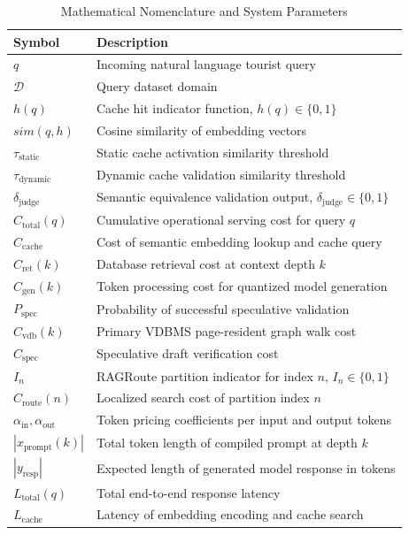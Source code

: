 \documentclass{ieeeaccess}
\begin{document}
\begin{table}[!t]
\centering
\caption{Mathematical Nomenclature and System Parameters}
\begin{tabular}{ll}
\toprule
\textbf{Symbol} & \textbf{Description} \\
\midrule
$q$ & Incoming natural language tourist query \\
$\mathcal{D}$ & Query dataset domain \\
$h(q)$ & Cache hit indicator function, $h(q) \in \{0, 1\}$ \\
$sim(q, h)$ & Cosine similarity of embedding vectors \\
$\tau_{\text{static}}$ & Static cache activation similarity threshold \\
$\tau_{\text{dynamic}}$ & Dynamic cache validation similarity threshold \\
$\delta_{\text{judge}}$ & Semantic equivalence validation output, $\delta_{\text{judge}} \in \{0, 1\}$ \\
$C_{\text{total}}(q)$ & Cumulative operational serving cost for query $q$ \\
$C_{\text{cache}}$ & Cost of semantic embedding lookup and cache query \\
$C_{\text{ret}}(k)$ & Database retrieval cost at context depth $k$ \\
$C_{\text{gen}}(k)$ & Token processing cost for quantized model generation \\
$P_{\text{spec}}$ & Probability of successful speculative validation \\
$C_{\text{vdb}}(k)$ & Primary VDBMS page-resident graph walk cost \\
$C_{\text{spec}}$ & Speculative draft verification cost \\
$I_n$ & RAGRoute partition indicator for index $n$, $I_n \in \{0, 1\}$ \\
$C_{\text{route}}(n)$ & Localized search cost of partition index $n$ \\
$\alpha_{\text{in}}, \alpha_{\text{out}}$ & Token pricing coefficients per input and output tokens \\
$|x_{\text{prompt}}(k)|$ & Total token length of compiled prompt at depth $k$ \\
$|y_{\text{resp}}|$ & Expected length of generated model response in tokens \\
$L_{\text{total}}(q)$ & Total end-to-end response latency \\
$L_{\text{cache}}$ & Latency of embedding encoding and cache search \\

\end{tabular}
\end{table}
\end{document}
